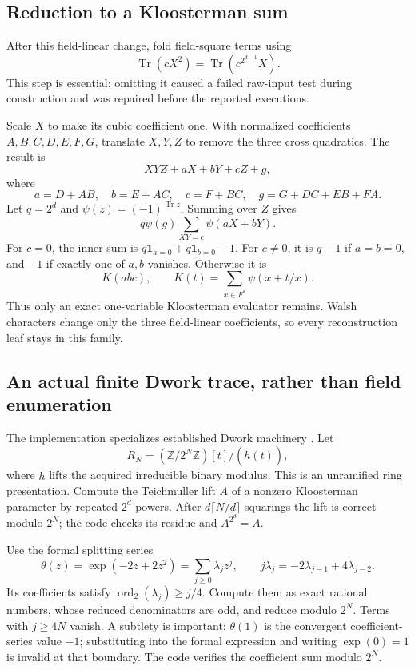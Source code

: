 \documentclass[11pt]{article}
\theoremstyle{remark}\newtheorem{remark}[theorem]{Remark}
\newcommand{\Tr}{\operatorname{Tr}}
\begin{document}
\subsection{Reduction to a Kloosterman sum}
After this field-linear change, fold field-square terms using
\[
 \Tr(cX^2)=\Tr(c^{2^{d-1}}X).
\]
This step is essential: omitting it caused a failed raw-input test during construction and was repaired before the reported executions.

Scale $X$ to make its cubic coefficient one. With normalized coefficients $A,B,C,D,E,F,G$, translate $X,Y,Z$ to remove the three cross quadratics. The result is
\[
 XYZ+aX+bY+cZ+g,
\]
where
\[
 a=D+AB,\quad b=E+AC,\quad c=F+BC,\quad
 g=G+DC+EB+FA.
\]
Let $q=2^d$ and $\psi(z)=(-1)^{\Tr z}$. Summing over $Z$ gives
\[
 q\psi(g)\sum_{XY=c}\psi(aX+bY).
\]
For $c=0$, the inner sum is $q\mathbf1_{a=0}+q\mathbf1_{b=0}-1$. For $c\ne0$, it is $q-1$ if $a=b=0$, and $-1$ if exactly one of $a,b$ vanishes. Otherwise it is
\[
 K(abc),\qquad K(t)=\sum_{x\in F^*}\psi(x+t/x).
\]
Thus only an exact one-variable Kloosterman evaluator remains. Walsh characters change only the three field-linear coefficients, so every reconstruction leaf stays in this family.

\subsection{An actual finite Dwork trace, rather than field enumeration}
The implementation specializes established Dwork machinery \cite{lauderwan}. Let
\[
 R_N=(\mathbb Z/2^N\mathbb Z)[t]/(\widetilde h(t)),
\]
where $\widetilde h$ lifts the acquired irreducible binary modulus. This is an unramified ring presentation. Compute the Teichmuller lift $A$ of a nonzero Kloosterman parameter by repeated $2^d$ powers. After $d\lceil N/d\rceil$ squarings the lift is correct modulo $2^N$; the code checks its residue and $A^{2^d}=A$.

Use the formal splitting series
\[
 \theta(z)=\exp(-2z+2z^2)=\sum_{j\ge0}\lambda_jz^j,
 \qquad
 j\lambda_j=-2\lambda_{j-1}+4\lambda_{j-2}.
\]
Its coefficients satisfy $\operatorname{ord}_2(\lambda_j)\ge j/4$. Compute them as exact rational numbers, whose reduced denominators are odd, and reduce modulo $2^N$. Terms with $j\ge4N$ vanish. A subtlety is important: $\theta(1)$ is the convergent coefficient-series value $-1$; substituting into the formal expression and writing $\exp(0)=1$ is invalid at that boundary. The code verifies the coefficient sum modulo $2^N$.
\end{document}
